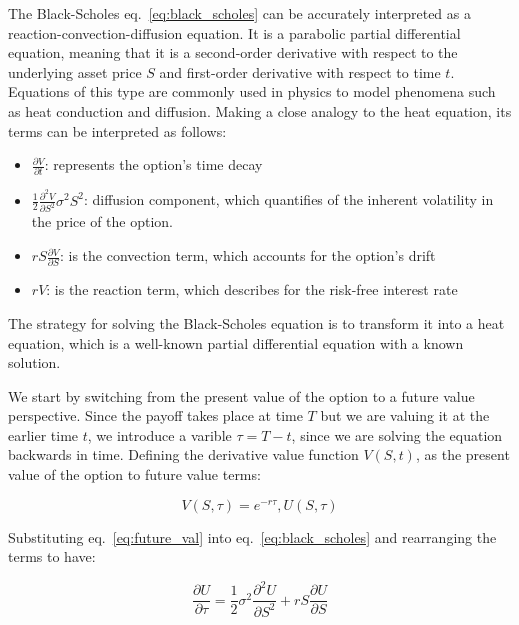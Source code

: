     The Black-Scholes eq.~\ref{eq:black_scholes} can be accurately interpreted as a reaction-convection-diffusion
    equation. It is a parabolic partial differential equation, meaning that it is a second-order derivative with respect
    to the underlying asset price $S$ and first-order derivative with respect to time $t$.
    Equations of this type are commonly used in physics to model phenomena such as heat conduction and diffusion.
    Making a close analogy to the heat equation, its terms can be interpreted as follows:

    \begin{itemize}
        \item $\frac{\partial V}{\partial t}$: represents the option's time decay
        \item $\frac{1}{2} \frac{\partial^2 V}{\partial S^2} \sigma^2 S^2$:
        diffusion component, which quantifies of the inherent volatility in the price of the option.
        \item $r S \frac{\partial V}{\partial S}$: is the convection term, which accounts for the option's drift
        \item $r V$: is the reaction term, which describes for the risk-free interest rate
        \label{eq:bs_terms}
    \end{itemize}

    The strategy for solving the Black-Scholes equation is to transform it into a heat equation,
    which is a well-known partial differential equation with a known solution.


    We start by switching from the present value of the option to a future value perspective.
    Since the payoff takes place at time $T$ but we are valuing it at the earlier time $t$,
    we introduce a varible $\tau = T - t$, since we are solving the equation backwards in time.
    Defining the derivative value function $V(S,t)$, as the present value of the option to future value terms:

    \begin{equation}
        V(S,\tau) = e^{-r \tau},U(S,\tau)
        \label{eq:future_val}
    \end{equation}

    Substituting eq.~\ref{eq:future_val} into eq.~\ref{eq:black_scholes} and rearranging the terms to have:

    \begin{equation}
        \frac{\partial U}{\partial \tau}
        = \frac{1}{2} \sigma^2 \frac{\partial^2 U}{\partial S^2}
        + rS \frac{\partial U}{\partial S}
        \label{eq:heat_eq}
    \end{equation}

